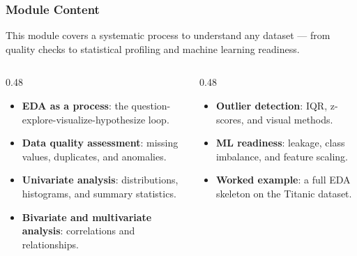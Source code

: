 \documentclass[aspectratio=169,10pt]{beamer}
\newcommand{\keyword}[1]{\textcolor{PrimaryBlue}{\textbf{#1}}}
\begin{document}
\begin{frame}
\frametitle{Module Content}
\small
This module covers a systematic process to understand any dataset --- from quality checks to statistical profiling and machine learning readiness.

\vspace{0.16cm}
\begin{columns}[T,totalwidth=0.96\textwidth]
\begin{column}{0.48\textwidth}
\begin{itemize}\setlength\itemsep{0.08cm}
  \item \keyword{EDA as a process}: the question-explore-visualize-hypothesize loop.
  \item \keyword{Data quality assessment}: missing values, duplicates, and anomalies.
  \item \keyword{Univariate analysis}: distributions, histograms, and summary statistics.
  \item \keyword{Bivariate and multivariate analysis}: correlations and relationships.
\end{itemize}
\end{column}
\begin{column}{0.48\textwidth}
\begin{itemize}\setlength\itemsep{0.08cm}
  \item \keyword{Outlier detection}: IQR, z-scores, and visual methods.
  \item \keyword{ML readiness}: leakage, class imbalance, and feature scaling.
  \item \keyword{Worked example}: a full EDA skeleton on the Titanic dataset.
\end{itemize}
\end{column}
\end{columns}
\end{frame}
\end{document}
